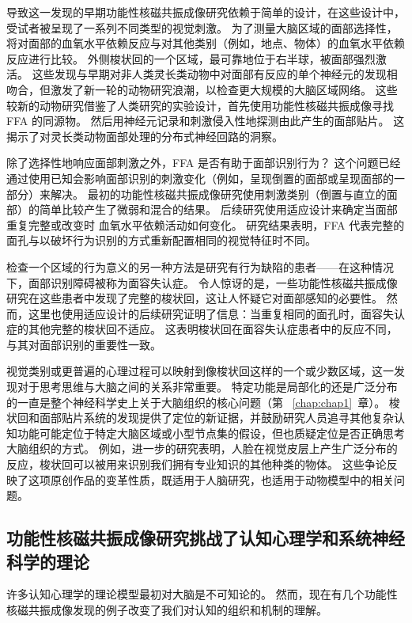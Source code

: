 导致这一发现的早期功能性核磁共振成像研究依赖于简单的设计，在这些设计中，受试者被呈现了一系列不同类型的视觉刺激。
为了测量大脑区域的面部选择性，将对面部的血氧水平依赖反应与对其他类别（例如，地点、物体）的血氧水平依赖反应进行比较。 
外侧梭状回的一个区域，最可靠地位于右半球，被面部强烈激活。
这些发现与早期对非人类灵长类动物中对面部有反应的单个神经元的发现相吻合，但激发了新一轮的动物研究浪潮，以检查更大规模的大脑区域网络。
这些较新的动物研究借鉴了人类研究的实验设计，首先使用功能性核磁共振成像寻找 FFA 的同源物。
然后用神经元记录和刺激侵入性地探测由此产生的面部贴片。
这揭示了对灵长类动物面部处理的分布式神经回路的洞察。


除了选择性地响应面部刺激之外，FFA 是否有助于面部识别行为？ 
这个问题已经通过使用已知会影响面部识别的刺激变化（例如，呈现倒置的面部或呈现面部的一部分）来解决。 
最初的功能性核磁共振成像研究使用刺激类别（倒置与直立的面部）的简单比较产生了微弱和混合的结果。
后续研究使用适应设计来确定当面部重复完整或改变时 血氧水平依赖活动如何变化。
研究结果表明，FFA 代表完整的面孔与以破坏行为识别的方式重新配置相同的视觉特征时不同。


检查一个区域的行为意义的另一种方法是研究有行为缺陷的患者——在这种情况下，面部识别障碍被称为面容失认症。
令人惊讶的是，一些功能性核磁共振成像研究在这些患者中发现了完整的梭状回，这让人怀疑它对面部感知的必要性。 
然而，这里也使用适应设计的后续研究证明了信息：当重复相同的面孔时，面容失认症的其他完整的梭状回不适应。 
这表明梭状回在面容失认症患者中的反应不同，与其对面部识别的重要性一致。


视觉类别或更普遍的心理过程可以映射到像梭状回这样的一个或少数区域，这一发现对于思考思维与大脑之间的关系非常重要。
特定功能是局部化的还是广泛分布的一直是整个神经科学史上关于大脑组织的核心问题（第 ~\ref{chap:chap1}~章）。 
梭状回和面部贴片系统的发现提供了定位的新证据，并鼓励研究人员追寻其他复杂认知功能可能定位于特定大脑区域或小型节点集的假设，但也质疑定位是否正确思考大脑组织的方式。
例如，进一步的研究表明，人脸在视觉皮层上产生广泛分布的反应，梭状回可以被用来识别我们拥有专业知识的其他种类的物体。
这些争论反映了这项原创作品的变革性质，既适用于人脑研究，也适用于动物模型中的相关问题。



\subsection{功能性核磁共振成像研究挑战了认知心理学和系统神经科学的理论}

许多认知心理学的理论模型最初对大脑是不可知论的。 
然而，现在有几个功能性核磁共振成像发现的例子改变了我们对认知的组织和机制的理解。


